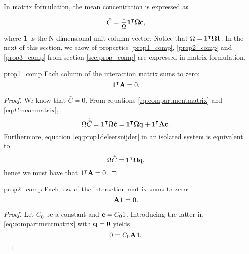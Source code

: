 In matrix formulation, the mean concentration is expressed as
\begin{equation} \label{eq:Cmeanmatrix}
	\bar C = \frac{1}{\Omega} \mathbf 1^\intercal \boldsymbol \Omega \mathbf c,
\end{equation}
where $\mathbf 1$ is the N-dimensional unit column vector. Notice that $\Omega = \mathbf 1^\intercal \boldsymbol \Omega \mathbf 1$. In the next of this section, we show of properties \ref{prop1_comp}, \ref{prop2_comp} and \ref{prop3_comp} from section \ref{sec:prop_comp} are expressed in matrix formulation.
\begin{propertybis}{prop1_comp} \label{prop1bis_comp}
Each column of the interaction matrix sums to zero:
\begin{equation}
	\mathbf 1^\intercal \mathbf A = 0.
\end{equation}
\end{propertybis} 
\begin{proof}
	We know that $\dot{\bar C} = 0$. From equations \eqref{eq:compartmentmatrix} and \eqref{eq:Cmeanmatrix},
	\begin{equation}
		\Omega \dot{\bar{C}} = \mathbf 1^\intercal \boldsymbol \Omega \dot{\mathbf{c}} = \mathbf 1^\intercal \boldsymbol \Omega \mathbf q + \mathbf 1^\intercal\mathbf A \mathbf c.
	\end{equation}
	Furthermore, equation \eqref{eq:prop1deleersnijder} in an isolated system is equivalent to
	\begin{equation}
		\Omega \dot{\bar{C}} = \mathbf 1^\intercal \boldsymbol \Omega \mathbf q,
	\end{equation}
	hence we must have that $\mathbf 1^\intercal \mathbf A = 0$.
\end{proof}

\begin{propertybis}{prop2_comp} \label{prop2bis_comp}
	Each row of the interaction matrix sums to zero:
	\begin{equation}
		\mathbf A \mathbf 1 = 0.		
	\end{equation}	
\end{propertybis}
\begin{proof}
	Let $C_0$ be a constant and $\mathbf c = C_0 \mathbf 1$. Introducing the latter in \eqref{eq:compartmentmatrix} with $\mathbf q = \mathbf 0$ yields
	\begin{equation}
		0 = C_0 \mathbf A \mathbf 1.
	\end{equation}
\end{proof}

